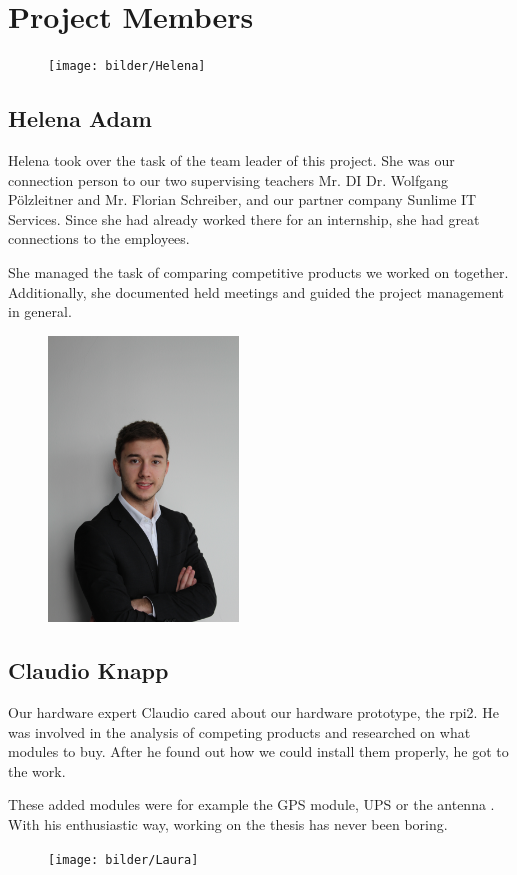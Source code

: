 \chapter*{Project Members}
\begin{figure}
    \texttt{[image: bilder/Helena]}
\end{figure}
\section*{Helena Adam}
Helena took over the task of the team leader of this project. She was our connection person to our two supervising teachers Mr. DI Dr. Wolfgang Pölzleitner and Mr. Florian Schreiber, and our partner company Sunlime IT Services. Since she had already worked there for an internship, she had great connections to the employees.

She managed the task of comparing competitive products we worked on together. Additionally, she documented held meetings and guided the project management in general.
\begin{figure}
	\includegraphics[width=0.45\textwidth, angle =-90]{bilder/Claudio}
\end{figure}
\section*{Claudio Knapp}
Our hardware expert Claudio cared about our hardware prototype, the \gls{rpi2}. He was involved in the analysis of competing products and researched on what modules to buy. After he found out how we could install them properly, he got to the work.

These added modules were for example the GPS module, UPS or the antenna . With his enthusiastic way, working on the thesis has never been boring. 
\newpage
\begin{figure}
    \texttt{[image: bilder/Laura]}
\end{figure}
